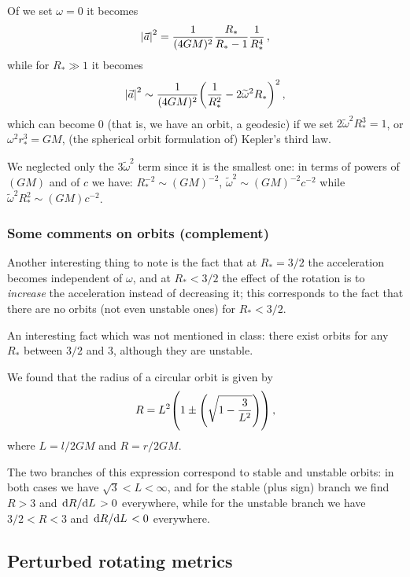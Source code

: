 \documentclass[main.tex]{subfiles}
\begin{document}
Of we set \(\omega = 0\) it becomes 
%
\begin{align}
  \abs{\vec{a}}^2 = \frac{1}{(4GM)^2} \frac{R_{*}}{R_{*}- 1} \frac{1}{R_{*}^4}
\,,
\end{align}
%
while for \(R_{*} \gg 1\) it becomes 
%
\begin{align}
  \abs{\vec{a}}^2 \sim \frac{1}{(4GM)^2} \qty(\frac{1}{R_{*}^2}
   - 2\widetilde{\omega}^2 R_{*})^2
\,,
\end{align}
%
which can become 0 (that is, we have an orbit, a geodesic) if we set \(2\widetilde{\omega}^2 R_{*}^3= 1\), or \(\omega^2 r_{*}^3 = GM\), (the spherical orbit formulation of) Kepler's third law. 

We neglected only the \(3 \widetilde{\omega}^2 \) term since it is the smallest one: in terms of powers of \((GM)\) and of \(c\) we have: \(R_{*}^{-2} \sim (GM)^{-2}\), \(\widetilde{\omega}^2\sim (GM)^{-2} c^{-2}\) while \(\widetilde{\omega}^2 R_{*}^2 \sim (GM) c^{-2}\).

\subsubsection{Some comments on orbits (complement)}

Another interesting thing to note is the fact that at \(R_{*} = 3/2\) the acceleration becomes independent of \(\omega \), and at \(R_{*} < 3/2\) the effect of the rotation is to \emph{increase} the acceleration instead of decreasing it; this corresponds to the fact that there are no orbits (not even unstable ones) for \(R_{*}<3/2\). 

An interesting fact which was not mentioned in class: there exist orbits for any \(R_{*}\) between \(3/2\) and \(3\), although they are unstable. 

We found that the radius of a circular orbit is given by  
%
\begin{align}
  R = L^2 \qty(1 \pm \qty(\sqrt{1 - \frac{3}{L^2}}))
\,,
\end{align}
%
where \(L = l / 2GM\) and \(R = r / 2GM\). 

The two branches of this expression correspond to stable and unstable orbits: in both cases we have \(\sqrt{3} < L < \infty \), and for the stable (plus sign) branch we find \(R > 3\) and \(\dv*{R}{L} > 0\) everywhere, while for the unstable branch we have \(3/2 < R < 3\) and \(\dv*{R}{L} < 0 \) everywhere. 

\subsection{Perturbed rotating metrics}
\end{document}

